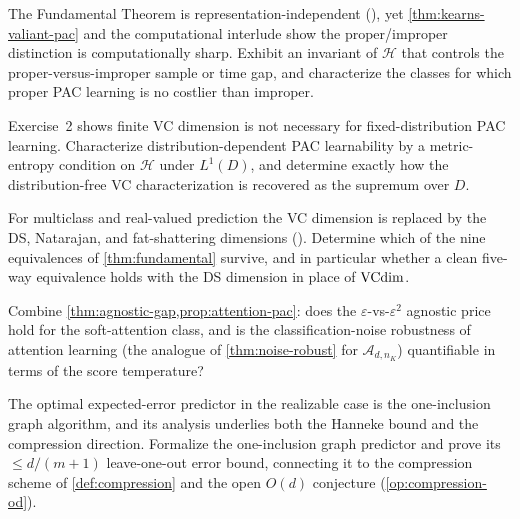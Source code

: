 \begin{openprob}
\label{op:proper-improper-pac}
The Fundamental Theorem is representation-independent (), yet \cref{thm:kearns-valiant-pac} and the computational interlude show the proper/improper distinction is computationally sharp.  Exhibit an invariant of $\mathcal{H}$ that controls the proper-versus-improper sample or time gap, and characterize the classes for which proper PAC learning is no costlier than improper.
\end{openprob}

\begin{openprob}
\label{op:distribution-dependent}
Exercise~2 shows finite VC dimension is not necessary for fixed-distribution PAC learning.  Characterize distribution-dependent PAC learnability by a metric-entropy condition on $\mathcal{H}$ under $L^1(D)$, and determine exactly how the distribution-free VC characterization is recovered as the supremum over $D$.
\end{openprob}

\begin{openprob}
\label{op:multiclass-fundamental}
For multiclass and real-valued prediction the VC dimension is replaced by the DS, Natarajan, and fat-shattering dimensions ().  Determine which of the nine equivalences of \cref{thm:fundamental} survive, and in particular whether a clean five-way equivalence holds with the DS dimension in place of $\mathrm{VCdim}$.
\end{openprob}

\begin{openprob}
\label{op:attention-agnostic}
Combine \cref{thm:agnostic-gap,prop:attention-pac}: does the $\varepsilon$-vs-$\varepsilon^2$ agnostic price hold for the soft-attention class, and is the classification-noise robustness of attention learning (the analogue of \cref{thm:noise-robust} for $\mathcal{A}_{d,n_K}$) quantifiable in terms of the score temperature?
\end{openprob}

\begin{openprob}
\label{op:one-inclusion}
The optimal expected-error predictor in the realizable case is the one-inclusion graph algorithm, and its analysis underlies both the Hanneke bound and the compression direction.  Formalize the one-inclusion graph predictor and prove its $\le d/(m+1)$ leave-one-out error bound, connecting it to the compression scheme of \cref{def:compression} and the open $O(d)$ conjecture (\cref{op:compression-od}).
\end{openprob}


